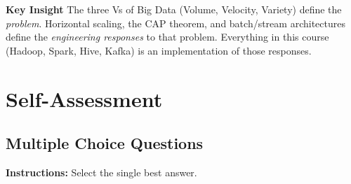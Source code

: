 \documentclass[12pt,a4paper]{article}
\newcommand{\insightbox}[1]{%
  \noindent
  \colorbox{PUGold!18}{%
    \begin{minipage}{\dimexpr\linewidth-2\fboxsep}
      \vspace{4pt}
      \textcolor{PUGold!70!black}{\textbf{Key Insight}} \quad #1
      \vspace{4pt}
    \end{minipage}%
  }\par\vspace{6pt}%
}
\begin{document}
\insightbox{The three Vs of Big Data (Volume, Velocity, Variety) define the \textit{problem}. Horizontal scaling, the CAP theorem, and batch/stream architectures define the \textit{engineering responses} to that problem. Everything in this course (Hadoop, Spark, Hive, Kafka) is an implementation of those responses.}

\section{Self-Assessment}

\subsection*{Multiple Choice Questions}

\noindent\textbf{Instructions:} Select the single best answer.
\end{document}
